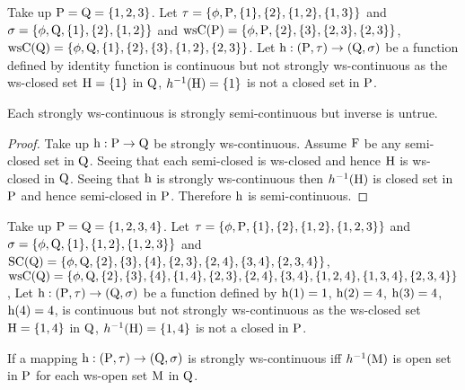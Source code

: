 \begin{exm}\label{exam3.3.11}
Take up $\mathrm{P}=\mathrm{Q}= \{1, 2, 3\}$. Let $\tau = \{\phi, \mathrm{P}, \{1\}, \{2\}, \{1, 2\},\{1,3\}\}$ and $\sigma =\{\phi, \mathrm{Q}, \{1\}, \{2\}, \{1, 2\}\}$ and $\mathrm{ws}\mathrm{C}(\mathrm{P})= \{\phi, \mathrm{P}, \{2\}, \{3\}, \{2, 3\},\{2,3\}\}$, $\mathrm{ws}\mathrm{C}(\mathrm{Q}) = \{\phi, \mathrm{Q}, \{1\}, \{2\},\{3\}, \{1, 2\},\{2,3\}\}$. Let $\mathrm{h}: (\mathrm{P}, \tau)\to (\mathrm{Q}, \sigma)$ be a function defined by identity function is continuous but not strongly ws-continuous as the ws-closed set $\mathrm{H}=\{1\}$ in $\mathrm{Q}$, $h^{-1}(\mathrm{H})=\{1\}$  is not a closed set in $\mathrm{P}$.
\end{exm}

\begin{thm}\label{thm3.3.12}
Each strongly ws-continuous is strongly semi-continuous but inverse is untrue.
\end{thm}

\begin{proof}
Take up $\mathrm{h}: \mathrm{P}\to \mathrm{Q}$ be strongly ws-continuous. Assume $\mathrm{F}$ be any semi-closed set in $\mathrm{Q}$. Seeing that each semi-closed is ws-closed and hence $\mathrm{H}$ is ws-closed in $\mathrm{Q}$. Seeing that $\mathrm{h}$ is strongly ws-continuous then $h^{-1}(\mathrm{H})$ is closed set in $\mathrm{P}$ and hence semi-closed in $\mathrm{P}$. Therefore $\mathrm{h}$ is semi-continuous.
\end{proof}

\begin{exm}\label{exam3.3.13}
Take up $\mathrm{P}= \mathrm{Q} = \{1, 2, 3, 4\}$. Let $\tau = \{\phi, \TSP, \{1\}, \{2\}, \{1, 2\},\break \{1,2,3\}\}$ and $\sigma =\{\phi, \mathrm{Q}, \{1\}, \{1,2\}, \{1,2,3\}\}$ and $\TSS\TSC(\TSQ)= \{\phi, \TSQ, \{2\}, \{3\}, \{4\},\break \{2, 3\},\{2, 4\}, \{3, 4\}, \{2, 3,4\}\}$, $\ws\TSC(\TSQ)= \{\phi, \TSQ, \{2\}, \{3\}, \{4\},\{1,4\},\{2,3\},\{2,4\},\break \{3,4\},\{1,2,4\},\{1,3,4\},\{2,3,4\}\}$, Let $\mathrm{h}: (\mathrm{P}, \tau )\to (\mathrm{Q}, \sigma)$ be a function defined by $\mathrm{h}(1)=1$, $\mathrm{h}(2)=4$, $\mathrm{h}(3)=4$, $\mathrm{h}(4)=4$, is continuous but not strongly ws-continuous as the ws-closed set $\mathrm{H}=\{1,4\}$ in $\mathrm{Q}$, $h^{-1}(\mathrm{H})=\{1,4\}$ is not a closed in $\mathrm{P}$.
\end{exm}

\begin{thm}\label{thm3.3.14}
If a mapping $\mathrm{h}: (\mathrm{P},\tau)\to (\mathrm{Q}, \sigma)$ is strongly ws-continuous iff $h^{-1}(\mathrm{M})$ is open set in $\mathrm{P}$ for each ws-open set $\mathrm{M}$ in $\mathrm{Q}$.
\end{thm}

